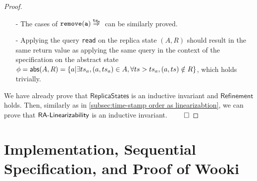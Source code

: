 \begin {proof}
\begin{itemize}
    Assume $\alinord = \alabel''_1 \cdot \ldots \cdot \alabel''_n$. Here additionally, we assume that $S$ is obtained from the initial replica state by applying effectors of $\alabel''_1,\ldots,\alabel''_m$, and we assume that $\alabel = \alabel''_{m+1}$.

    Since $\alinord$ is consistent with the visibility relation, for each operation $\alabel'$, such that $(\alabel',\alabel) \in \avisord$, we can see that, $\alabel' \in \{ \alabel''_1,\ldots,\alabel''_m \}$. By Annotation1 of $(A'', R'')$ and the effector of such $\alabel'$, we can see that $A'' \setminus \{ (a,\ats_a) \} \subseteq A$ and $R'' \subseteq R$, and thus, we can see that $A' = A \cup \{ (a,\ats_a) \}$ and $R' = R$.

    Since $\ats_a$ is greater than all the timestamps of operations whose effector have been applied in $S$, by Annotation2 of $S$, we can see that, for each $\ats \in \{ \ats' \vert (\_,\ats') \in S \}$, we have $\ats < \ats_a$. Therefore, we can see that $\refmap(A',R') = \refmap(A,R) \cup \{ a \} = \abstate'$.

\item[-] The cases of $\alabellongind[{\tt remove}]{a}{}{\ats_a}{}$ can be similarly proved.

\item[-] Applying the query {\tt read} on the replica state $(A,R)$ should result in the same return value as applying the same query in the context of the specification on the abstract state $\phi = \mathsf{abs}(A,R) = \{ a \vert \exists ts_a, (a,ts_a) \in A, \forall ts > ts_a, (a,ts) \notin R \}$, which holds trivially.
\end{itemize}


We have already prove that $\mathsf{ReplicaStates}$ is an inductive invariant and $\mathsf{Refinement}$ holds. Then, similarly as in \sectionautorefname \ref{subsec:time-stamp order as linearizabtion}, we can prove that $\mathsf{RA\text{-}Linearizability{}}$ is an inductive invariant. $\qed$
\end {proof}






\section{Implementation, Sequential Specification, and Proof of Wooki}
\label{sec:implementation, sequential specification, and proof of wooki}



